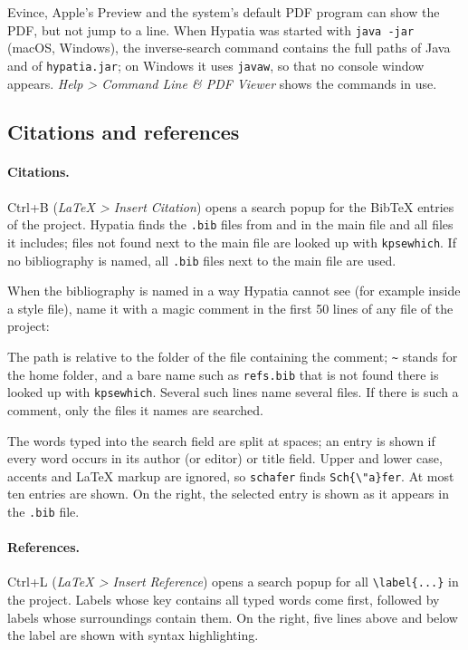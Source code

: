 \documentclass[11pt]{article}
\newcommand{\key}[1]{\textsf{#1}}
\newcommand{\menu}[1]{\textsf{\textit{#1}}}
\newcommand{\file}[1]{\texttt{#1}}
\begin{document}
    Evince, Apple's Preview and the system's default PDF program can show the PDF, but not jump to a line. When Hypatia was started with \verb+java -jar+ (macOS, Windows), the inverse-search command contains the full paths of Java and of \file{hypatia.jar}; on Windows it uses \verb+javaw+, so that no console window appears. \menu{Help > Command Line \& PDF Viewer} shows the commands in use.

    \subsection{Citations and references}\label{sec:citations}

    \paragraph{Citations.}     \key{Ctrl+B} (\menu{LaTeX > Insert Citation}) opens a search popup for the BibTeX entries of the project. Hypatia finds the \verb+.bib+ files from \verb++ and \verb++ in the main file and all files it includes; files not found next to the main file are looked up with \verb+kpsewhich+. If no bibliography is named, all \verb+.bib+ files next to the main file are used.

    When the bibliography is named in a way Hypatia cannot see (for example inside a style file), name it with a magic comment in the first 50 lines of any file of the project:
    \begin{Code}
    \end{Code}
    The path is relative to the folder of the file containing the comment; \verb+~+ stands for the home folder, and a bare name such as \verb+refs.bib+ that is not found there is looked up with \verb+kpsewhich+. Several such lines name several files. If there is such a comment, only the files it names are searched.

    The words typed into the search field are split at spaces; an entry is shown if every word occurs in its author (or editor) or title field. Upper and lower case, accents and LaTeX markup are ignored, so \verb+schafer+ finds \verb+Sch{\"a}fer+. At most ten entries are shown. On the right, the selected entry is shown as it appears in the \verb+.bib+ file.

    \paragraph{References.}     \key{Ctrl+L} (\menu{LaTeX > Insert Reference}) opens a search popup for all \verb+\label{...}+ in the project. Labels whose key contains all typed words come first, followed by labels whose surroundings contain them. On the right, five lines above and below the label are shown with syntax highlighting.
\end{document}
